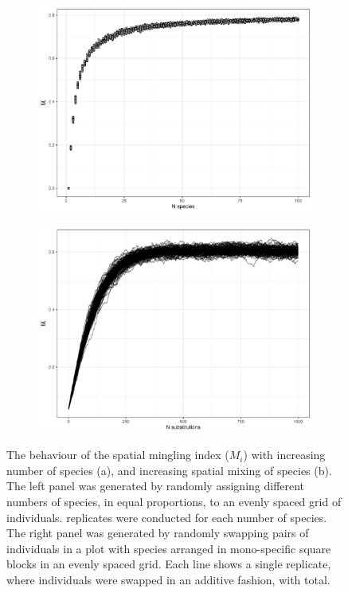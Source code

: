 \begin{refsection}
\begin{figure}
	\begin{subfigure}{0.45\linewidth}
		\includegraphics[width=\linewidth]{img/mingling_nspecies}
		\caption{}
		\label{workflow:mingling_nspecies}
	\end{subfigure}
	\hfill
	\begin{subfigure}{0.45\linewidth}
		\includegraphics[width=\linewidth]{img/mingling_nmingl}
		\caption{}
		\label{workflow:mingling_nmingl}
	\end{subfigure}
	\caption[Behaviour of the spatial mingling index with increasing number and spatial mixing of species]{The behaviour of the spatial mingling index ($M_{i}$) with increasing number of species (a), and increasing spatial mixing of species (b). The left panel was generated by randomly assigning different numbers of species, in equal proportions, to an evenly spaced grid of individuals. \mispreps{} replicates were conducted for each number of species. The right panel was generated by randomly swapping pairs of individuals in a plot with \minsp{} species arranged in mono-specific square blocks in an evenly spaced grid. Each line shows a single replicate, where individuals were swapped in an additive fashion, with \minreps{} total.} 
	\label{workflow:mingling_both}
\end{figure}


\end{refsection}
